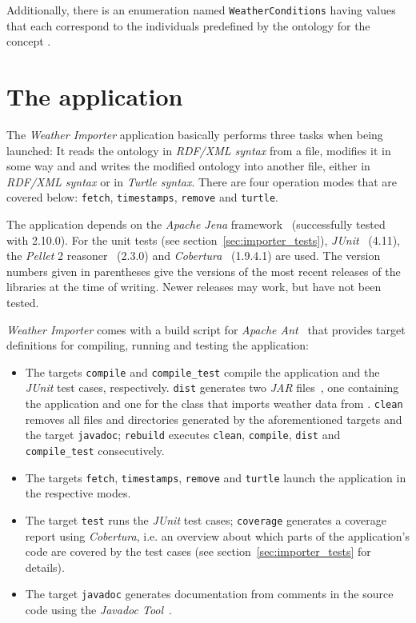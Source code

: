 Additionally, there is an enumeration named \texttt{WeatherConditions} having values that each correspond to the individuals predefined by the ontology for the concept .

\section{The application}
\label{sec:importer_application}

The \emph{Weather Importer} application basically performs three tasks when being launched: It reads the \thinkhomeweather ontology in \emph{RDF/XML syntax}\cite{RDF_XML} from a file, modifies it in some way and and writes the modified ontology into another file, either in \emph{RDF/XML syntax} or in \emph{Turtle syntax}\cite{Turtle}. There are four operation modes that are covered below: \texttt{fetch}, \texttt{timestamps}, \texttt{remove} and \texttt{turtle}.

The application depends on the \emph{Apache Jena} framework~\cite{apache_jena} (successfully tested with 2.10.0). For the unit tests (see section~\ref{sec:importer_tests}), \emph{JUnit}~\cite{junit} (4.11), the \emph{Pellet}  2 reasoner~\cite{pellet} (2.3.0) and \emph{Cobertura}~\cite{cobertura} (1.9.4.1) are used. The version numbers given in parentheses give the versions of the most recent releases of the libraries at the time of writing. Newer releases may work, but have not been tested.

\emph{Weather Importer} comes with a build script for \emph{Apache Ant}~\cite{apache_ant} that provides target definitions for compiling, running and testing the application:

\begin{itemize}
  \item The targets \texttt{compile} and \texttt{compile\_test} compile the application and the \emph{JUnit} test cases, respectively. \texttt{dist} generates two \emph{JAR} files~\cite{jar}, one containing the application and one for the class that imports weather data from \yrno. \texttt{clean} removes all files and directories generated by the aforementioned targets and the target \texttt{javadoc}; \texttt{rebuild} executes \texttt{clean}, \texttt{compile}, \texttt{dist} and \texttt{compile\_test} consecutively.
  \item The targets \texttt{fetch}, \texttt{timestamps}, \texttt{remove} and \texttt{turtle} launch the application in the respective modes.
  \item The target \texttt{test} runs the \emph{JUnit} test cases; \texttt{coverage} generates a coverage report using \emph{Cobertura}, i.e. an overview about which parts of the application's code are covered by the test cases (see section~\ref{sec:importer_tests} for details).
  \item The target \texttt{javadoc} generates documentation from comments in the source code using the \emph{Javadoc Tool}~\cite{javadoc}.
\end{itemize}

